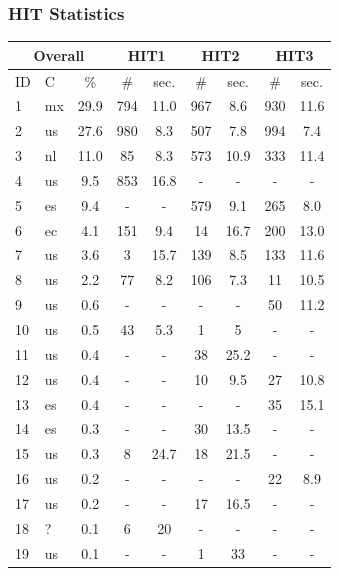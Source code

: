 \documentclass[10pt]{beamer}
\begin{document}
\begin{frame}
  \frametitle{HIT Statistics}
\begin{center}
\begin{small}
\begin{tabular}{|l|l|c|c|c|c|c|c|c|}
 \hline
 \multicolumn{3}{|c|}{Overall} & \multicolumn{2}{|c|}{HIT1} & \multicolumn{2}{|c|}{HIT2} & \multicolumn{2}{|c|}{HIT3}  \\ \hline
 ID & C & \% & \# & sec. & \# & sec. & \# & sec. \\ \hline %
 1 & mx & 29.9 & 794 & 11.0 & 967 & 8.6 & 930 & 11.6 \\ %
 2 & us & 27.6 & 980 & 8.3 & 507 & 7.8 & 994 & 7.4 \\ %
 3 & nl & 11.0 & 85 & 8.3 & 573 & 10.9 & 333 & 11.4 \\ %
 4 & us & 9.5 & 853 & 16.8 & - & - & - & - \\ %
 5 & es & 9.4 & - & - & 579 & 9.1 & 265 & 8.0 \\ %
 6 & ec & 4.1 & 151 & 9.4 & 14 & 16.7 & 200 & 13.0 \\ %
 7 & us & 3.6 & 3 & 15.7 & 139 & 8.5 & 133 & 11.6 \\ %
 8 & us & 2.2 & 77 & 8.2 & 106 & 7.3 & 11 & 10.5 \\ %
 9 & us & 0.6 & - & - & - & - & 50 & 11.2 \\ %
 10 & us & 0.5 & 43 & 5.3 & 1 & 5 & - & - \\ %
 11 & us & 0.4 & - & - & 38 & 25.2 & - & - \\ %
 12 & us & 0.4 & - & - & 10 & 9.5 & 27 & 10.8 \\ %
 13 & es & 0.4 & - & - & - & - & 35 & 15.1 \\ %
 14 & es & 0.3 & - & - & 30 & 13.5 & - & - \\ %
 15 & us & 0.3 & 8 & 24.7 & 18 & 21.5 & - & - \\ %
 16 & us & 0.2 & - & - & - & - & 22 & 8.9 \\ %
 17 & us & 0.2 & - & - & 17 & 16.5 & - & - \\ %
 18 & ? & 0.1 & 6 & 20  & - & - & - & -  \\ %
 19 & us & 0.1 & - & - & 1 & 33 & - & -  \\ %
 \hline
\end{tabular}
\end{small}
\end{center}
\end{frame}
\end{document}
